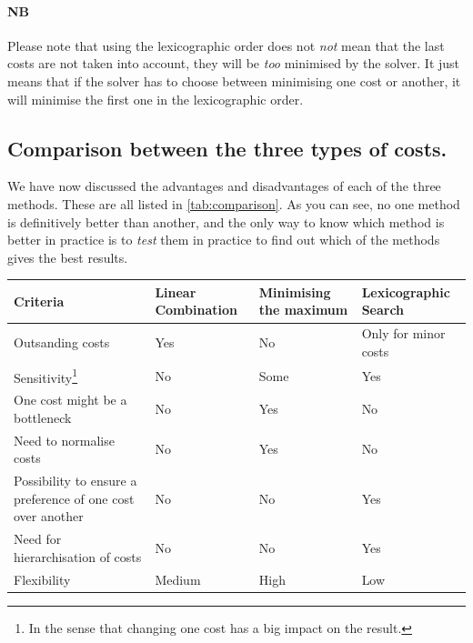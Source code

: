 \paragraph{NB} Please note that using the lexicographic order does not \textit{not} mean that the last costs are not taken into account, they will be \textit{too} minimised by the solver. It just means that if the solver has to choose between minimising one cost or another, it will minimise the first one in the lexicographic order. 

\subsection{Comparison between the three types of costs.}

We have now discussed the advantages and disadvantages of each of the three methods. These are all listed in \ref{tab:comparison}. As you can see, no one method is definitively better than another, and the only way to know which method is better in practice is to \textit{test} them in practice to find out which of the methods gives the best results. 

\begin{center}
    \centering
    \label{tab:comparison}
    \begin{tabularx}{\textwidth}{|>{\centering\arraybackslash}p{4cm}|>{\centering\arraybackslash}X|>{\centering\arraybackslash}X|>{\centering\arraybackslash}X|}
        \hline
        \textbf{Criteria} & \textbf{Linear Combination} & \textbf{Minimising the maximum} & \textbf{Lexicographic Search} \\
        \hline
        Outsanding costs & \cellcolor{red!25}Yes & \cellcolor{green!25}No & \cellcolor{orange!25}Only for minor costs \\
        \hline
        Sensitivity\footnote{In the sense that changing one cost has a big impact on the result.} & \cellcolor{red!25}No & \cellcolor{orange!25}Some & \cellcolor{green!25}Yes \\
        \hline
        One cost might be a bottleneck & \cellcolor{green!25}No & \cellcolor{red!25}Yes & \cellcolor{green!25}No \\
        \hline
        Need to normalise costs& \cellcolor{green!25}No & \cellcolor{red!25}Yes & \cellcolor{green!25}No \\
        \hline
        Possibility to ensure a preference of one cost over another  & \cellcolor{red!25}No & \cellcolor{red!25}No & \cellcolor{green!25}Yes \\
        \hline
        Need for hierarchisation of costs & \cellcolor{green!25}No & \cellcolor{green!25}No & \cellcolor{red!25}Yes \\
        \hline
        Flexibility & \cellcolor{orange!25}Medium & \cellcolor{green!25}High & \cellcolor{red!25}Low \\
        \hline

    \end{tabularx}
\end{center}

